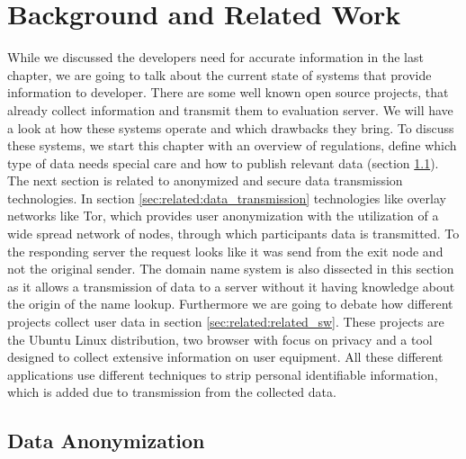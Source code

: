 \chapter{Background and Related Work}
\label{chap:related_work}
%

While we discussed the developers need for accurate information in the last chapter, we are going to talk about the current state of systems that provide information to developer. There are some well known open source projects, that already collect information and transmit them to evaluation server. We will have a look at how these systems operate and which drawbacks they bring.
To discuss these systems, we start this chapter with an overview of regulations, define which type of data needs special care and how to publish relevant data (section \ref{sec:related:data_aononymization}).\\ 
The next section is related to anonymized and secure data transmission technologies. In section \ref{sec:related:data_transmission} technologies like overlay networks like Tor, which provides user anonymization with the utilization of a wide spread network of nodes, through which participants data is transmitted. To the responding server the request looks like it was send from the exit node and not the original sender. The domain name system is also dissected in this section as it allows a transmission of data to a server without it having knowledge about the origin of the name lookup.
Furthermore we are going to debate how different projects collect user data in section \ref{sec:related:related_sw}. These projects are the Ubuntu Linux distribution, two browser with focus on privacy and a tool designed to collect extensive information on user equipment.
All these different applications use different techniques to strip personal identifiable information, which is added due to transmission from the collected data.

\newpage

\section{Data Anonymization}
    \label{sec:related:data_aononymization}
    

